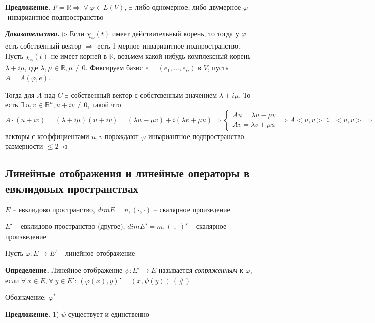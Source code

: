 \vspace{\baselineskip}
\textbf{Предложение.} $F = \mathbb{R} \Rightarrow \ \forall \ \varphi \in L(V)$, $\exists$ либо одномерное, либо двумерное $\varphi$-инвариантное подпространство

\vspace{\baselineskip}
\textbf{\textit{Доказательство.}} $\rhd$ Если $\chi_{\varphi} (t)$ имеет действительный корень, то тогда у $\varphi$ есть собственный вектор $\Rightarrow$ есть 1-мерное инвариантное подпространство. Пусть $\chi_{\varphi} (t)$ не имеет корней в $\mathbb{R}$, возьмем какой-нибудь комплексный корень $\lambda + i \mu$, где $\lambda, \mu \in \mathbb{R}, \mu \neq 0$. Фиксируем базис $e = (e_1, \dots, e_n)$ в $V$, пусть $A = A(\varphi, e)$. 

Тогда для $A$ над $C$ $\exists$ собственный вектор с собстсвенным значением $\lambda + i \mu$. То есть $\exists \ u, v \in \mathbb{R}^n, u + i v \neq 0$, такой что $A \cdot (u + iv) = (\lambda + i \mu) (u + iv) = (\lambda u - \mu v) + i (\lambda v + \mu u) \Rightarrow \begin{cases}
        Au = \lambda u - \mu v \\
        Av = \lambda v + \mu u
\end{cases} \Rightarrow A <u, v> \subseteq <u, v> \Rightarrow$ векторы с коэффициентами $u, v$ порождают $\varphi$-инвариантное подпространство размерности $\leq 2 \ \lhd$

\subsection{Линейные отображения и линейные операторы в евклидовых пространствах}

$E$ -- евклидово пространство, $dim E = n, ( \cdot, \cdot)$ -- скалярное произедение

$E'$ -- евклидово пространство (другое), $dim E' = m, (\cdot, \cdot)'$ -- скалярное произведение

Пусть $\varphi: E \rightarrow E'$ -- линейное отображение

\textbf{Определение.} Линейное отображение $\psi: E' \rightarrow E$ называется \textit{сопряженным} к $\varphi$, если $\forall \ x \in E, \forall \ y \in E': \ (\varphi(x), y)' = (x, \psi(y)) \ (\#)$

Обозначение: $\varphi^*$

\vspace{\baselineskip}
\textbf{Предложение.} 1) $\psi$ существует и единственно

